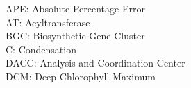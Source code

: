 
APE: Absolute Percentage Error\\
AT: Acyltransferase\\
BGC: Biosynthetic Gene Cluster\\
C: Condensation\\
DACC: Analysis and Coordination Center\\
DCM: Deep Chlorophyll Maximum\\
